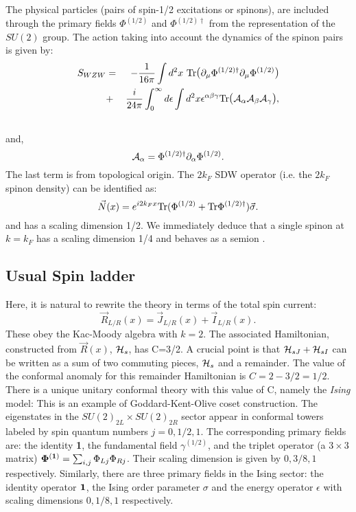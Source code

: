 The physical particles (pairs of spin-1/2 excitations or spinons),
are included through the primary 
fields $\Phi^{(1/2)}$ and $\Phi^{(1/2)\dag}$ from the representation of the 
$SU(2)$ group. The action taking into account 
the dynamics of the spinon pairs is given by:
\begin{eqnarray}
S_{WZW}&=&-\frac{1}{16\pi}\int d^2 x\ 
\hbox{Tr}\hbox{\large(}
\partial_{\mu}\Phi^{(1/2)\dag}\partial_{\mu}\Phi^{(1/2)}\hbox{\large)}
\\ \nonumber
&+&\frac{i}{24\pi}\int_0^{\infty} d\epsilon\int d^2 x
\epsilon^{\alpha\beta\gamma} \hbox{Tr}
\hbox{\large(}{\cal A}_{\alpha}{\cal A}_{\beta}{\cal A}_
{\gamma}\hbox{\large)},\\ \nonumber
\end{eqnarray}
and, 
\begin{equation}
{\cal A}_{\alpha}=\Phi^{(1/2)\dag}\partial_{\alpha}\Phi^{(1/2)}.
\end{equation}
The last term is from topological origin. The $2k_F$ SDW operator 
(i.e. the $2k_F$ spinon density) can be
identified as:
\begin{equation}
\vec{N}(x)=e^{i2k_Fx}\hbox{Tr}(\Phi^{(1/2)}+\hbox{Tr}\Phi^{(1/2)\dag})\vec{\sigma}.
\end{equation}
and has a scaling dimension 1/2. We immediately deduce that a single
spinon at $k=k_F$ has a scaling dimension 1/4 and behaves as a semion
\cite{BS,Haldane1}.

\subsection{Usual Spin ladder}

Here, it is natural to rewrite the theory in terms of the total spin current:
\begin{equation}
\vec{R}_{L/R}(x)=\vec{J}_{L/R}(x)+\vec{I}_{L/R}(x).
\end{equation}
These obey the Kac-Moody algebra with $k=2$. The associated Hamiltonian,
constructed from $\vec{R}(x)$, ${\cal H}_s$, has C=3/2. 
A crucial point is that ${\cal H}_{sJ}+{\cal H}_{sI}$ can be written as a sum
of two commuting pieces, ${\cal H}_s$ and a remainder. The value of the
conformal anomaly for this remainder Hamiltonian is $C=2-3/2=1/2$. There is
a unique unitary conformal theory
 with this value of C, namely the {\it Ising} model:
This is an
example of Goddard-Kent-Olive coset construction\cite{GKO}.
The eigenstates in the $SU(2)_{2L}\times SU(2)_{2R}$ sector appear in
conformal towers labeled by spin quantum numbers $j=0,1/2,1$. The
corresponding primary fields are: the identity {\bf 1}, the fundamental field
${\gamma}^{(1/2)}$, and the triplet operator (a $3\times 3$ matrix) 
${\bf \Phi^{(1)}}=\sum_{i,j}\Phi_{Lj}\Phi_{Rj}$. Their scaling dimension
is given by $0,3/8,1$ respectively.
Similarly, there are three primary fields in the Ising sector: the identity
operator ${\bf 1}$, the Ising order parameter $\sigma$ and the energy operator
$\epsilon$ with scaling dimensions $0,1/8,1$ respectively. 

